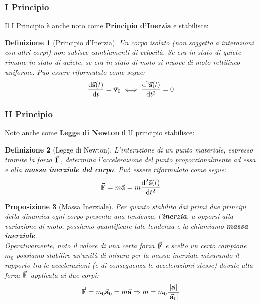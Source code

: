 \documentclass{article}
\newtheorem{defn}{Definizione}[section]
\newtheorem{prop}[defn]{Proposizione}
\newcommand{\then}{\ensuremath{\Rightarrow}}
\renewcommand{\a}{\va{a}}
\renewcommand{\v}{\va{v}}
\newcommand{\s}{\va{s}}
\newcommand{\F}{\va{F}}
\begin{document}
\subsubsection{I Principio}
Il I Principio è anche noto come \textbf{Principio d'Inerzia} e stabilisce:
\begin{defn}[Principio d'Inerzia]
Un corpo isolato (non soggetto a interazioni con altri corpi) non subisce cambiamenti di velocità. Se era in stato di quiete rimane in stato di quiete, se era in stato di moto si muove di moto rettilineo uniforme.
Può essere riformulato come segue:
\[ \dv{\s(t)}{t}=\v_0 \iff \dv[2]{\s(t)}{t}=0\]
\end{defn}



\subsubsection{II Principio}

Noto anche come \textbf{Legge di Newton} il II principio stabilisce:
\begin{defn}[Legge di Newton]
L'interazione di un punto materiale, espresso tramite la forza $\F$, determina l'accelerazione del punto proporzionalmente ad essa e alla \textbf{massa inerziale del corpo}. Può essere riformulato come segue:
\[\F=m\a=m\dv[2]{\s(t)}{t}\]
\end{defn}

\begin{prop}[Massa Inerziale]
Per quanto stabilito dai primi due principi della dinamica ogni corpo presenta una tendenza, l'\textbf{inerzia}, a opporsi alla variazione di moto, possiamo quantificare tale tendenza e la chiamiamo \textbf{massa inerziale}.\\
Operativamente, noto il valore di una certa forza $\F$ e scelto un certo campione $m_0$ possiamo stabilire un'unità di misura per la massa inerziale misurando il rapporto tra le accelerazioni (e di conseguenza le accelerazioni stesse) dovute alla forza $\F$ applicata ai due corpi:
\[\F=m_0\a_0=m\a\then m=m_0\frac{|\a|}{|\a_0|}\]
\end{prop}
\end{document}
